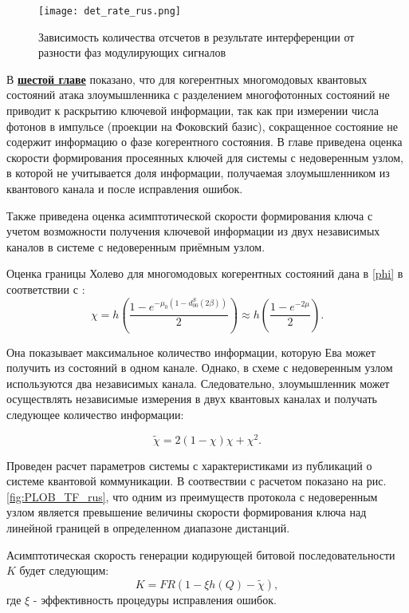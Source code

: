  \begin{figure}[ht]
  \centering
  \texttt{[image: det\_rate\_rus.png]}
  \caption{Зависимость количества отсчетов в результате интерференции от разности фаз модулирующих сигналов}
  \label{fig:det_rate_TF_RUS_ref}
\end{figure}


 В \underline{\textbf{шестой главе}} показано, что для когерентных многомодовых квантовых состояний атака злоумышленника с разделением многофотонных состояний не приводит к раскрытию ключевой информации, так как при измерении числа фотонов в импульсе (проекции на Фоковский базис), сокращенное состояние не содержит информацию о фазе когерентного состояния. В главе приведена оценка скорости формирования просеянных ключей для системы с недоверенным узлом, в которой не учитывается доля информации, получаемая злоумышленником из квантового канала и после исправления ошибок.
 
 
  Также приведена оценка асимптотической скорости формирования ключа с учетом возможности получения ключевой информации из двух независимых каналов в системе с недоверенным приёмным узлом. 
 
 Оценка границы Холево для многомодовых когерентных состояний дана в \ref{phi} в соответствии с \cite{kozubov2019finite}:
\begin{equation}
    \chi=h\left(\frac{1-e^{-\mu_0(1-d^S_{00}(2\beta))}}{2}\right)\approx h\left(\frac{1-e^{-2\mu}}{2}\right).
\end{equation}

Она показывает максимальное количество информации, которую Ева может получить из состояний в одном канале. Однако, в схеме с недоверенным узлом используются два независимых канала. Следовательно, злоумышленник может осуществлять независимые измерения в двух квантовых каналах и получать следующее количество информации:


\begin{equation}
    \tilde{\chi}=2(1-\chi)\chi+\chi^2.
\end{equation}

 Проведен расчет параметров системы с характеристиками из публикаций о системе квантовой коммуникации. В соотвествии с расчетом показано на рис. \ref{fig:PLOB_TF_rus}, что одним из преимуществ протокола с недоверенным узлом является превышение величины скорости формирования ключа над линейной границей в определенном диапазоне дистанций.


Асимптотическая скорость генерации кодирующей битовой последовательности $K$ будет следующим:
\begin{equation}
     K=FR(1-\xi h(Q)-\tilde{\chi}),
\end{equation}
где $\xi$ - эффективность процедуры исправления ошибок. 





